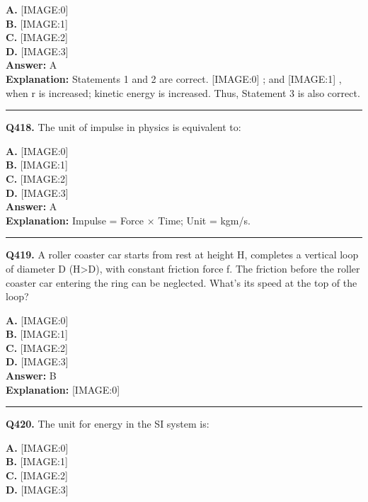 \documentclass[12pt]{article}
\begin{document}
\textbf{A.} [IMAGE:0] \\
\textbf{B.} [IMAGE:1] \\
\textbf{C.} [IMAGE:2] \\
\textbf{D.} [IMAGE:3] \\

\textbf{Answer:} A \\
\textbf{Explanation:} Statements 1 and 2 are correct.
[IMAGE:0]
; and
[IMAGE:1]
, when r is increased; kinetic energy is increased. Thus, Statement 3 is also correct.

\hrule
\vspace{1em}


\noindent
\textbf{Q418.} The unit of impulse in physics is equivalent to:



\textbf{A.} [IMAGE:0] \\
\textbf{B.} [IMAGE:1] \\
\textbf{C.} [IMAGE:2] \\
\textbf{D.} [IMAGE:3] \\

\textbf{Answer:} A \\
\textbf{Explanation:} Impulse = Force × Time; Unit = kgm/s.

\hrule
\vspace{1em}


\noindent
\textbf{Q419.} A roller coaster car starts from rest at height H, completes a vertical loop of diameter D (H>D), with constant friction force f. The friction before the roller coaster car entering the ring can be neglected. What's its speed at the top of the loop?



\textbf{A.} [IMAGE:0] \\
\textbf{B.} [IMAGE:1] \\
\textbf{C.} [IMAGE:2] \\
\textbf{D.} [IMAGE:3] \\

\textbf{Answer:} B \\
\textbf{Explanation:} [IMAGE:0]

\hrule
\vspace{1em}


\noindent
\textbf{Q420.} The unit for energy in the SI system is:



\textbf{A.} [IMAGE:0] \\
\textbf{B.} [IMAGE:1] \\
\textbf{C.} [IMAGE:2] \\
\textbf{D.} [IMAGE:3] \\
\end{document}
